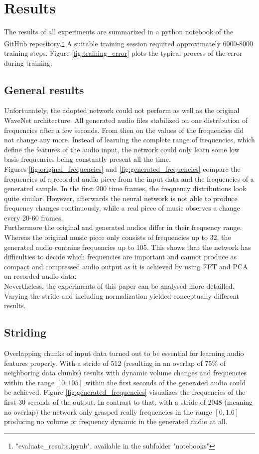 \documentclass[10pt,conference,compsocconf]{IEEEtran}
\begin{document}
\section{Results}
The results of all experiments are summarized in a python notebook of the GitHub repository.\footnote{"evaluate\_results.ipynb", available in the subfolder "notebooks"} A suitable training session required approximately 6000-8000 training steps. Figure \ref{fig:training_error} plots the typical process of the error during training.\\
\subsection{General results}
 Unfortunately, the adopted network could not perform as well as the original WaveNet architecture. All generated audio files stabilized on one distribution of frequencies after a few seconds. From then on the values of the frequencies did not change any more. Instead of learning the complete range of frequencies, which define the features of the audio input, the network could only learn some low basis frequencies being constantly present all the time.\\
Figures \ref{fig:original_frequencies} and \ref{fig:generated_frequencies} compare the frequencies of a recorded audio piece from the input data and the frequencies of a generated sample. In the first 200 time frames, the frequency distributions look quite similar. However, afterwards the neural network is not able to produce frequency changes continuously, while a real piece of music observes a change every 20-60 frames.\\
Furthermore the original and generated audios differ in their frequency range. Whereas the original music piece only consists of frequencies up to 32, the generated audio contains frequencies up to 105. This shows that the network has difficulties to decide which frequencies are important and cannot produce as compact and compressed audio output as it is achieved by using FFT and PCA on recorded audio data.\\
Nevertheless, the experiments of this paper can be analysed more detailled. Varying the stride and including normalization yielded conceptually different results.\\
\subsection{Striding}
Overlapping chunks of input data turned out to be essential for learning audio features properly. With a stride of 512 (resulting in an overlap of 75\% of neighboring data chunks) results with dynamic volume changes and frequencies within the range $[0, 105]$ within the first seconds of the generated audio could be achieved. Figure \ref{fig:generated_frequencies} visualizes the frequencies of the first 30 seconds of the output. In contrast to that, with a stride of 2048 (meaning no overlap) the network only grasped really frequencies in the range $[0,1.6]$ producing no volume or frequency dynamic in the generated audio at all.
\end{document}
